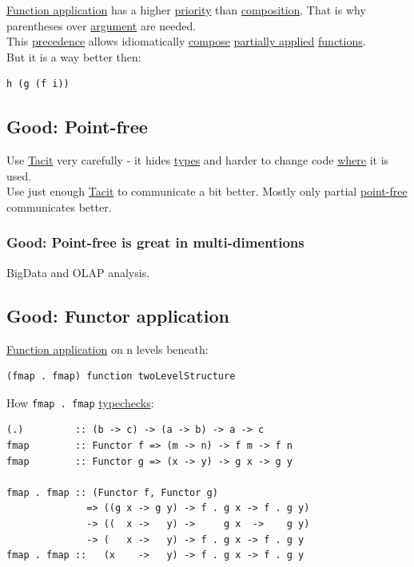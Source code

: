 \documentclass[11pt]{article}
\begin{document}
\hyperref[org6ff03b0]{Function application} has a higher \hyperref[org091696a]{priority} than \hyperref[org24a8abd]{composition}. That is why parentheses over \hyperref[orgf66a5f7]{argument} are needed.\\
This \hyperref[orgd18f0db]{precedence} allows idiomatically \hyperref[orgb292e6e]{compose} \hyperref[orgd8b581f]{partially applied} \hyperref[org66c5288]{functions}.\\

But it is a way better then:\\
\begin{verbatim}
h (g (f i))
\end{verbatim}

\subsection{\label{org3b8eb2c}Good: Point-free}
\label{sec:org4c293ee}
Use \hyperref[orgb712b11]{Tacit} very carefully - it hides \hyperref[org3927fd9]{types} and harder to change code \hyperref[orgefd1ecd]{where} it is used.\\
Use just enough \hyperref[orgb712b11]{Tacit} to communicate a bit better. Mostly only partial \hyperref[orgb88b386]{point-free} communicates better.\\

\subsubsection{\label{orgb95d127}Good: Point-free is great in multi-dimentions}
\label{sec:org9b71ae9}
BigData and OLAP analysis.\\

\subsection{\label{org48b91be}Good: Functor application}
\label{sec:orgdc9c56b}
\hyperref[org6ff03b0]{Function application} on n levels beneath:\\
\begin{verbatim}
(fmap . fmap) function twoLevelStructure
\end{verbatim}

How \texttt{fmap . fmap} \hyperref[org58a3de1]{typechecks}:\\
\begin{verbatim}
(.)         :: (b -> c) -> (a -> b) -> a -> c
fmap        :: Functor f => (m -> n) -> f m -> f n
fmap        :: Functor g => (x -> y) -> g x -> g y

fmap . fmap :: (Functor f, Functor g)
              => ((g x -> g y) -> f . g x -> f . g y)
              -> ((  x ->   y) ->     g x  ->    g y)
              -> (   x ->   y) -> f . g x -> f . g y
fmap . fmap ::   (x    ->   y) -> f . g x -> f . g y
\end{verbatim}
\end{document}
